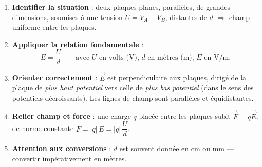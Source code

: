 \documentclass[11pt]{article}
\newcommand{\cle}[1]{{\popxbold\color{popdark}#1}}
\begin{document}
\begin{methode}
\begin{enumerate}
\item \textbf{Identifier la situation} : deux plaques planes, parallèles, de grandes dimensions, soumises à une tension $U = V_A - V_B$, distantes de $d$ $\Rightarrow$ champ \cle{uniforme} entre les plaques.
\item \textbf{Appliquer la relation fondamentale} :
\[
E = \frac{U}{d} \qquad \text{avec } U \text{ en volts (V), } d \text{ en mètres (m), } E \text{ en V/m}.
\]
\item \textbf{Orienter correctement} : $\vec{E}$ est perpendiculaire aux plaques, dirigé de la plaque de \emph{plus haut potentiel} vers celle de \emph{plus bas potentiel} (dans le sens des potentiels décroissants). Les lignes de champ sont parallèles et équidistantes.
\item \textbf{Relier champ et force} : une charge $q$ placée entre les plaques subit $\vec{F} = q\vec{E}$, de norme constante $F = |q|\,E = |q|\,\dfrac{U}{d}$.
\item \textbf{Attention aux conversions} : $d$ est souvent donnée en cm ou mm — convertir impérativement en mètres.
\end{enumerate}
\end{methode}
\end{document}

